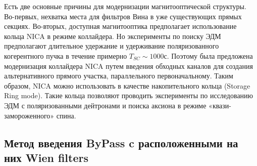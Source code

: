 \par Есть две основные причины для модернизации магнитооптической структуры. Во-первых, нехватка места для фильтров Вина в уже существующих прямых секциях. Во-вторых, доступная магнитооптика предполагает использование кольца NICA в режиме коллайдера. Но эксперименты по поиску ЭДМ предполагают длительное удержание и удерживание поляризованного когерентного пучка в течение примерно $T_{SC} \sim 1000 с$. Поэтому была предложена модернизация коллайдера NICA путем введения обходных каналов для создания альтернативного прямого участка, параллельного первоначальному. Таким образом, NICA можно использовать в качестве накопительного кольца (Storage Ring mode). Такие кольца позволяют проводить эксперименты по исследованию ЭДМ с поляризованными дейтронами и поиска аксиона в режиме «квази-замороженного» спина.

\subsection{Метод введения ByPass c расположенными на них Wien filters}\label{sec:EDM/QFS/Wien_filter}


